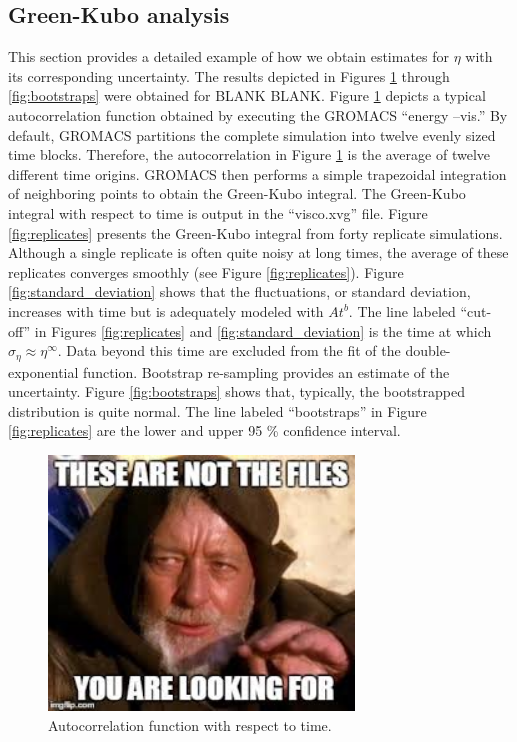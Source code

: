 \documentclass[preprint,review,12pt]{elsarticle}
\begin{document}
	
	\subsection{Green-Kubo analysis}
	
	This section provides a detailed example of how we obtain estimates for $\eta$ with its corresponding uncertainty. The results depicted in Figures \ref{fig:autocorrelation} through \ref{fig:bootstraps} were obtained for BLANK BLANK. Figure \ref{fig:autocorrelation} depicts a typical autocorrelation function obtained by executing the GROMACS ``energy --vis.'' By default, GROMACS partitions the complete simulation into twelve evenly sized time blocks. Therefore, the autocorrelation in Figure \ref{fig:autocorrelation} is the average of twelve different time origins. GROMACS then performs a simple trapezoidal integration of neighboring points to obtain the Green-Kubo integral. The Green-Kubo integral with respect to time is output in the ``visco.xvg'' file. Figure \ref{fig:replicates} presents the Green-Kubo integral from forty replicate simulations. Although a single replicate is often quite noisy at long times, the average of these replicates converges smoothly (see Figure \ref{fig:replicates}). Figure \ref{fig:standard_deviation} shows that the fluctuations, or standard deviation, increases with time but is adequately modeled with $A t^{b}$. The line labeled ``cut-off'' in Figures \ref{fig:replicates} and \ref{fig:standard_deviation} is the time at which $\sigma_{\eta} \approx \eta^\infty$. Data beyond this time are excluded from the fit of the double-exponential function. Bootstrap re-sampling provides an estimate of the uncertainty. Figure \ref{fig:bootstraps} shows that, typically, the bootstrapped distribution is quite normal. The line labeled ``bootstraps'' in Figure \ref{fig:replicates} are the lower and upper 95 \% confidence interval.
	
	\begin{figure}[htb!]
		\centering
		\includegraphics[width=3.2in]{empty_figure.jpg}
		\caption{Autocorrelation function with respect to time.}
		\label{fig:autocorrelation}
	\end{figure} 
\end{document}
